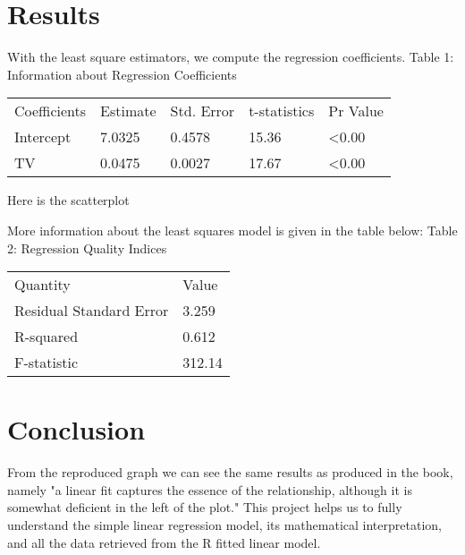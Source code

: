 \documentclass[a4paper]{article}
\begin{document}
\section{Results}

With the least square estimators, we compute the regression coefficients.\newline
Table 1: Information about Regression Coefficients

\vspace{2mm}
\begin{tabular}{ | p{3cm} | p{2cm} | p{2cm} | p{2cm} | p{2cm} |}
  \hline			
  Coefficients & Estimate & Std. Error & t-statistics & Pr Value \\
  Intercept & 7.0325 & 0.4578 & 15.36 & <0.00 \\
  TV & 0.0475 & 0.0027 & 17.67 & <0.00 \\
  \hline  
\end{tabular}

\vspace{5mm}
Here is the scatterplot


\vspace{5mm}
More information about the least squares model is given in the table below: \newline
Table 2: Regression Quality Indices

\vspace{2mm}
\begin{tabular}{ | p{4cm} | p{2cm} | }
  \hline			
  Quantity & Value \\
  Residual Standard Error & 3.259 \\
  R-squared & 0.612 \\
  F-statistic & 312.14 \\
  \hline  
\end{tabular}

\section{Conclusion}
From the reproduced graph we can see the same results as produced in the book, namely "a linear fit captures the essence of the relationship, although it is somewhat deficient in the left of the plot." This project helps us to fully understand the simple linear regression model, its mathematical interpretation, and all the data retrieved from the R fitted linear model.
\end{document}
